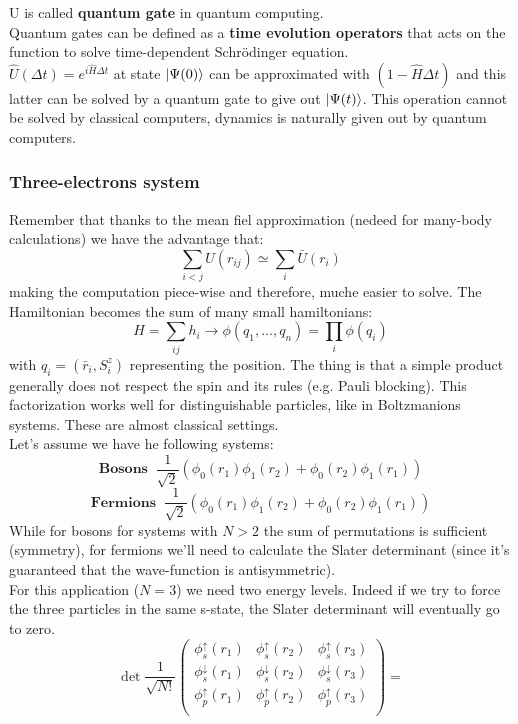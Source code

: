 U is called \textbf{quantum gate} in quantum computing.\\
Quantum gates can be defined as a \textbf{time evolution operators} that acts on the function to solve time-dependent Schr\"odinger equation.\\
$\hat{U}(\Delta t) = e^{i\hat{H}\Delta t}$ at state $\ket{\Psi(0)}$ can be approximated with $(1-\hat{H}\Delta t)$ and this latter can be solved by a quantum gate to give out $\ket{\Psi(t)}$. This operation cannot be solved by classical computers, dynamics is naturally given out by quantum computers.\\

\subsubsection{Three-electrons system}
Remember that thanks to the mean fiel approximation (nedeed for many-body calculations) we have the advantage that:
\[
\sum_{i<j} U(r_{ij}) \simeq \sum_i \bar{U}(r_i)
\]
making the computation piece-wise and therefore, muche easier to solve.
The Hamiltonian becomes the sum of many small hamiltonians:
\[
H = \sum_{ij} h_i \rightarrow \phi(q_1, ... , q_n) = \prod_i \phi(q_i)
\]
with $q_i = (\bar{r}_i, S^z_i)$ representing the position. The thing is that a simple product generally does not respect the spin and its rules (e.g. Pauli blocking). This factorization works well for distinguishable particles, like in Boltzmanions systems. These are almost classical settings. \\
Let's assume we have he following systems:
\[
\textbf{Bosons} \;\; \frac{1}{\sqrt{2}}(\phi_0(r_1)\phi_1(r_2) + \phi_0(r_2)\phi_1(r_1))
\]
\[
\textbf{Fermions} \;\; \frac{1}{\sqrt{2}}(\phi_0(r_1)\phi_1(r_2) + \phi_0(r_2)\phi_1(r_1))
\]
While for bosons for systems with $N>2$ the sum of permutations is sufficient (symmetry), for fermions we'll need to calculate the Slater determinant (since it's guaranteed that the wave-function is antisymmetric). \\
For this application ($N = 3 $) we need two energy levels. Indeed if we try to force the three particles in the same s-state, the Slater determinant will eventually go to zero.\\
\[
\det\frac{1}{\sqrt{N!}}
\begin{pmatrix}
\phi_s^\uparrow(r_1)&\phi_s^\uparrow(r_2)&\phi_s^\uparrow(r_3)\\
\phi_s^\downarrow(r_1)&\phi_s^\downarrow(r_2)&\phi_s^\downarrow(r_3)\\
\phi_p^\uparrow(r_1)&\phi_p^\uparrow(r_2)&\phi_p^\uparrow(r_3)\\
\end{pmatrix}=
\]
